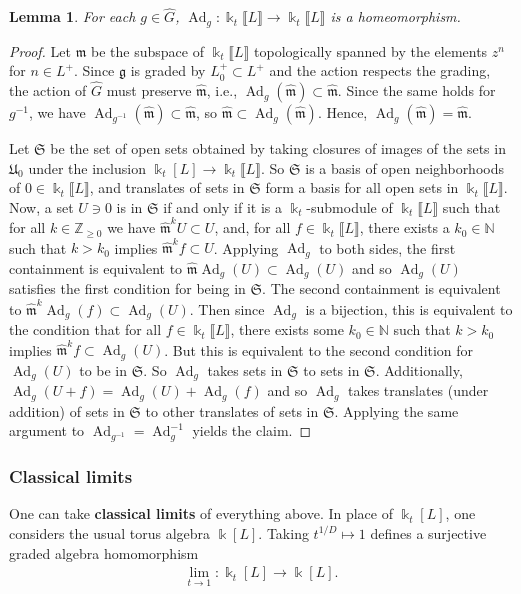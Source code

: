 \documentclass{amsart}
\DeclareMathOperator{\Ad}{Ad}
\let\llb=\llbracket
\let\rrb=\rrbracket
\let\bb=\mathbb
\let\rar=\rightarrow
\let\f=\mathfrak
\let\wh=\widehat
\newcommand {\kk} {\Bbbk}
\theoremstyle{plain}%
\newtheorem{lem}[thm]{Lemma}
\theoremstyle{definition}
\theoremstyle{remark}
\begin{document}
\begin{lem}\label{AdHomeo}
For each $g\in \hat{G}$, $\Ad_g\colon \kk_t\llb L\rrb\rar \kk_t\llb L\rrb$ is a homeomorphism. 
\end{lem}
\begin{proof}
Let $\hat{\f{m}}$ be the subspace of $\kk_t\llb L\rrb$  topologically spanned by the elements $z^n$ for $n\in L^+$.   Since $\f{g}$ is graded by $L_0^+\subset L^+$ and the action respects the grading, the action of $\hat{G}$ must preserve $\hat{\f{m}}$, i.e., $\Ad_g(\hat{\f{m}})\subset \hat{\f{m}}$. Since the same holds for $g^{-1}$, we have $\Ad_{g^{-1}}(\hat{\f{m}})\subset \hat{\f{m}}$, so $\hat{\f{m}}\subset \Ad_{g}(\hat{\f{m}})$. Hence, $\Ad_g(\hat{\f{m}})=\hat{\f{m}}$.

Let $\f{S}$ be the set of open sets obtained by taking closures of images of the sets in $\f{U}_0$ under the inclusion $\kk_t[L]\rightarrow \kk_t\llb L\rrb$.  So $\f{S}$ is a basis of open neighborhoods of $0\in\kk_t\llb L\rrb$, and translates of sets in $\f{S}$ form a basis for all open sets in $\kk_t\llb L\rrb$.  Now, a set $U\ni 0$ is in $\f{S}$ if and only if it is a $\kk_t$-submodule of $\kk_t\llb L\rrb$ such that for all $k\in \mathbb{Z}_{\geq 0}$ we have $\wh{\f{m}}^kU\subset U$, and, for all $f\in \kk_t\llb L\rrb$, there exists a $k_0\in \bb{N}$ such that $k>k_0$ implies $\wh{\f{m}}^kf\subset U$.  Applying $\Ad_g$ to both sides, the first containment is equivalent to $\wh{\f{m}}\Ad_g(U)\subset \Ad_g(U)$ and so $\Ad_g(U)$ satisfies the first condition for being in $\f{S}$.  The second containment is equivalent to $\wh{\f{m}}^k\Ad_g(f)\subset \Ad_g(U)$.  Then since $\Ad_g$ is a bijection, this is equivalent to the condition that for all $f\in \kk_t\llb L\rrb$, there exists some $k_0\in \bb{N}$ such that $k>k_0$ implies $\wh{\f{m}}^k f\subset \Ad_g(U)$.  But this is equivalent to the second condition for $\Ad_g(U)$ to be in $\f{S}$.  So $\Ad_g$ takes sets in $\f{S}$ to sets in $\f{S}$.  Additionally, $\Ad_g(U+f)=\Ad_g(U)+\Ad_g(f)$ and so $\Ad_g$ takes translates (under addition) of sets in $\f{S}$ to other translates of sets in $\f{S}$.  Applying the same argument to $\Ad_{g^{-1}}=\Ad_g^{-1}$ yields the claim.
\end{proof}


\subsubsection{Classical limits}\label{scS}
One can take \textbf{classical limits} of everything above.  In place of $\kk_t[L]$, one considers the usual torus algebra $\kk[L]$.  Taking $t^{1/D}\mapsto 1$ defines a surjective graded algebra homomorphism
\begin{align*}
    \lim_{t\rar 1}\colon  \kk_t[L] \rar \kk[L].
\end{align*}
\end{document}
